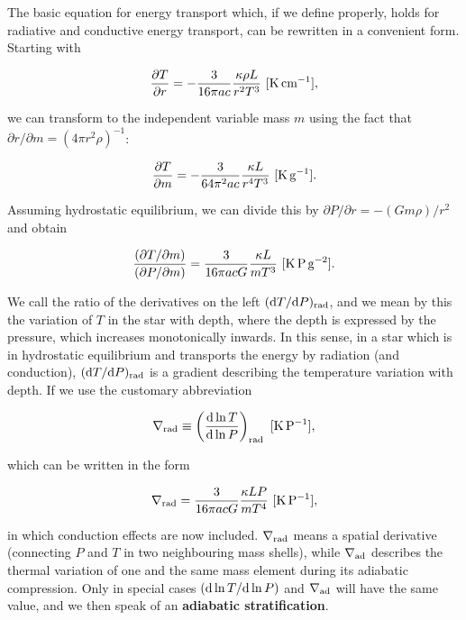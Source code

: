 \documentclass[a4paper,10pt]{article}
\begin{document}
{\noindent}The basic equation for energy transport which, if we define properly, holds for radiative and conductive energy transport, can be rewritten in a convenient form. Starting with

\begin{align*}
    \frac{\partial T}{\partial r} = - \frac{3}{16\pi ac} \frac{\kappa\rho L}{r^2T^3} ~ [{\rm K\,cm^{-1}}],
\end{align*}

{\noindent}we can transform to the independent variable mass $m$ using the fact that $\partial r/\partial m = (4\pi r^2\rho)^{-1}$:

\begin{align*}
    \frac{\partial T}{\partial m} = - \frac{3}{64\pi^2 ac} \frac{\kappa L}{r^4T^3} ~ [{\rm K\,g^{-1}}].
\end{align*}

{\noindent}Assuming hydrostatic equilibrium, we can divide this by $\partial P/\partial r = -(Gm\rho)/r^2$ and obtain

\begin{align*}
    \frac{(\partial T/\partial m)}{(\partial P/\partial m)} = \frac{3}{16\pi acG}\frac{\kappa L}{mT^3} ~ [{\rm K\,P\,g^{-2}}].
\end{align*}

{\noindent}We call the ratio of the derivatives on the left $({\rm d}T/{\rm d}P)_{\rm rad}$, and we mean by this the variation of $T$ in the star with depth, where the depth is expressed by the pressure, which increases monotonically inwards. In this sense, in a star which is in hydrostatic equilibrium and transports the energy by radiation (and conduction), $({\rm d}T/{\rm d}P)_{\rm rad}$ is a gradient describing the temperature variation with depth. If we use the customary abbreviation

\begin{align*}
    \nabla_{\rm rad} \equiv \left(\frac{{\rm d}\ln T}{{\rm d}\ln P}\right)_{\rm rad} ~ [{\rm K\,P^{-1}}],
\end{align*}

{\noindent}which can be written in the form

\begin{align*}
    \nabla_{\rm rad} = \frac{3}{16\pi acG}\frac{\kappa LP}{mT^4} ~ [{\rm K\,P^{-1}}],
\end{align*}

{\noindent}in which conduction effects are now included. $\nabla_{\rm rad}$ means a spatial derivative (connecting $P$ and $T$ in two neighbouring mass shells), while $\nabla_{\rm ad}$ describes the thermal variation of one and the same mass element during its adiabatic compression. Only in special cases $({\rm d}\ln T/{\rm d}\ln P)$ and $\nabla_{\rm ad}$ will have the same value, and we then speak of an \textbf{adiabatic stratification}.
\end{document}
